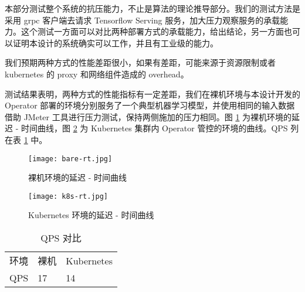 本部分测试整个系统的抗压能力，不止是算法的理论推导部分。我们的测试方法是采用 grpc 客户端去请求 Tensorflow Serving 服务，加大压力观察服务的承载能力。这个测试一方面可以对比两种部署方式的承载能力，给出结论，另一方面也可以证明本设计的系统确实可以工作，并且有工业级的能力。

我们预期两种方式的性能差距很小，如果有差距，可能来源于资源限制或者 kubernetes 的 proxy 和网络组件造成的 overhead。

测试结果表明，两种方式的性能指标有一定差距，我们在裸机环境与本设计开发的 Operator 部署的环境分别服务了一个典型机器学习模型，并使用相同的输入数据借助 JMeter 工具进行压力测试，保持两侧施加的压力相同。图 \ref{fig:bare-rt} 为裸机环境的延迟 - 时间曲线，图 \ref{fig:k8s-rt} 为 Kubernetes 集群内 Operator 管控的环境的曲线。QPS 列在表 \ref{qps-table} 中。

\begin{figure}

\centering

\texttt{[image: bare-rt.jpg]}

\caption{裸机环境的延迟 - 时间曲线}\label{fig:bare-rt}

\end{figure}

\begin{figure}

\centering

\texttt{[image: k8s-rt.jpg]}

\caption{Kubernetes 环境的延迟 - 时间曲线}\label{fig:k8s-rt}

\end{figure}

\begin{table}[]
\begin{tabular}{lll}
环境  & 裸机 & Kubernetes \\
QPS & 17 & 14        
\end{tabular}
\caption{QPS 对比}\label{qps-table}
\end{table}